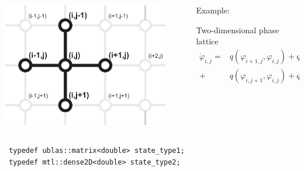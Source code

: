 \begin{frame}[fragile]

 \vspace{1ex}
 \begin{columns}[T]
  \begin{column}{0.4\textwidth}
   \centerline{\includegraphics[draft=false,width=0.9\textwidth]{2dlattice.pdf}}
  \end{column}
  \begin{column}{0.58\textwidth}
Example: 

\vspace{1ex}
Two-dimensional phase lattice
\begin{align*}
\dot{\varphi}_{i,j} = &
  q(\varphi_{i+1,j},\varphi_{i,j}) 
 + q(\varphi_{i-1,j},\varphi_{i,j}) \\
 + & q(\varphi_{i,j+1},\varphi_{i,j}) 
 + q(\varphi_{i,j-1},\varphi_{i,j})
 \end{align*}
  \end{column}
 \end{columns}

\vspace{2ex}

\begin{lstlisting}
 typedef ublas::matrix<double> state_type1;
 typedef mtl::dense2D<double> state_type2;
\end{lstlisting}

\pause
\vspace{1ex}



\end{frame}
